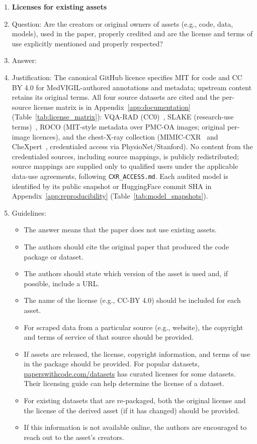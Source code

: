 \begin{enumerate}
\item {\bf Licenses for existing assets}
    \item[] Question: Are the creators or original owners of assets (e.g., code, data, models), used in the paper, properly credited and are the license and terms of use explicitly mentioned and properly respected?
    \item[] Answer: \answerYes{}
    \item[] Justification: The canonical GitHub licence specifies MIT for code and CC BY 4.0 for MedVIGIL-authored annotations and metadata; upstream content retains its original terms. All four source datasets are cited and the per-source license matrix is in Appendix~\ref{app:documentation} (Table~\ref{tab:license_matrix}): VQA-RAD (CC0)~\cite{lau2018vqarad}, SLAKE (research-use terms)~\cite{liu2021slake}, ROCO (MIT-style metadata over PMC-OA images; original per-image licences), and the chest-X-ray collection (MIMIC-CXR~\cite{johnson2019mimiccxr} and CheXpert~\cite{irvin2019chexpert}, credentialed access via PhysioNet/Stanford). No content from the credentialed sources, including source mappings, is publicly redistributed; source mappings are supplied only to qualified users under the applicable data-use agreements, following \texttt{CXR\_ACCESS.md}. Each audited model is identified by its public snapshot or HuggingFace commit SHA in Appendix~\ref{app:reproducibility} (Table~\ref{tab:model_snapshots}).
    \item[] Guidelines:
    \begin{itemize}
        \item The answer \answerNA{} means that the paper does not use existing assets.
        \item The authors should cite the original paper that produced the code package or dataset.
        \item The authors should state which version of the asset is used and, if possible, include a URL.
        \item The name of the license (e.g., CC-BY 4.0) should be included for each asset.
        \item For scraped data from a particular source (e.g., website), the copyright and terms of service of that source should be provided.
        \item If assets are released, the license, copyright information, and terms of use in the package should be provided. For popular datasets, \url{paperswithcode.com/datasets} has curated licenses for some datasets. Their licensing guide can help determine the license of a dataset.
        \item For existing datasets that are re-packaged, both the original license and the license of the derived asset (if it has changed) should be provided.
        \item If this information is not available online, the authors are encouraged to reach out to the asset's creators.
    \end{itemize}


\end{enumerate}
